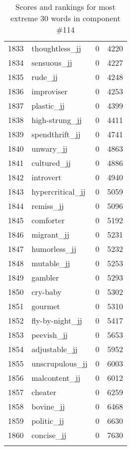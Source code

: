\begin{longtable}[!htbp]{| rlr@{.}l |}
    1833 & thoughtless\_jj & 0 & 4220 \\
    1834 & sensuous\_jj & 0 & 4227 \\
    1835 & rude\_jj & 0 & 4248 \\
    1836 & improviser & 0 & 4253 \\
    1837 & plastic\_jj & 0 & 4399 \\
    1838 & high-strung\_jj & 0 & 4411 \\
    1839 & spendthrift\_jj & 0 & 4741 \\
    1840 & unwary\_jj & 0 & 4863 \\
    1841 & cultured\_jj & 0 & 4886 \\
    1842 & introvert & 0 & 4940 \\
    1843 & hypercritical\_jj & 0 & 5059 \\
    1844 & remiss\_jj & 0 & 5096 \\
    1845 & comforter & 0 & 5192 \\
    1846 & migrant\_jj & 0 & 5231 \\
    1847 & humorless\_jj & 0 & 5232 \\
    1848 & mutable\_jj & 0 & 5253 \\
    1849 & gambler & 0 & 5293 \\
    1850 & cry-baby & 0 & 5302 \\
    1851 & gourmet & 0 & 5310 \\
    1852 & fly-by-night\_jj & 0 & 5417 \\
    1853 & peevish\_jj & 0 & 5653 \\
    1854 & adjustable\_jj & 0 & 5952 \\
    1855 & unscrupulous\_jj & 0 & 6003 \\
    1856 & malcontent\_jj & 0 & 6012 \\
    1857 & cheater & 0 & 6259 \\
    1858 & bovine\_jj & 0 & 6468 \\
    1859 & politic\_jj & 0 & 6630 \\
    1860 & concise\_jj & 0 & 7630 \\
    \hline
    \caption{Scores and rankings for most extreme 30 words in component \#114} \\
\end{longtable}
